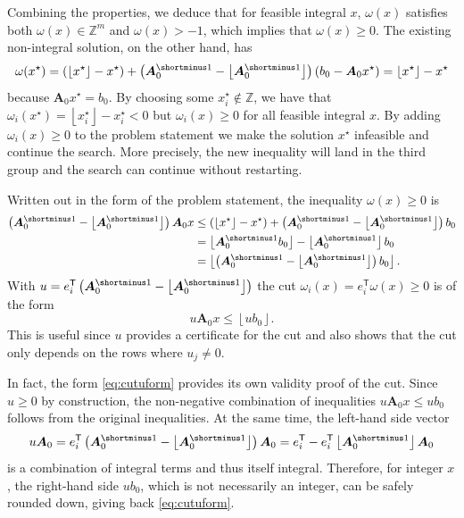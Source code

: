 \documentclass[a4paper, 12pt]{article}
\newcommand{\Z} {\mathbb{Z}}
\newcommand{\minv} { {\shortminus1} }
\newcommand{\mtrp} {\mathsf{T}}
\newcommand{\floor}[1]{\left\lfloor #1 \right\rfloor}
\newcommand{\stared}[1]{#1^\star}
\begin{document}
Combining the properties, we deduce that for feasible integral $x$, $\omega(x)$ satisfies both $\omega(x) \in \Z^m$ and $\omega(x) > -1$, which implies that $\omega(x) \geq 0$.
The existing non-integral solution, on the other hand, has
\begin{equation*}
\omega(\stared{x}) = \left(\floor{\stared{x}} - \stared{x}\right) + \left(\bm{A}_0^\minv - \floor{\bm{A}_0^\minv}\right) \left(b_0 - \bm{A}_0 \stared{x}\right) = \floor{\stared{x}} - \stared{x}
\end{equation*}
because $\bm{A}_0 \stared{x} = b_0$. By choosing some $\stared{x}_i \notin \Z$, we have that $\omega_i(\stared{x}) = \floor{\stared{x}_i} - \stared{x}_i < 0$ but $\omega_i(x) \geq 0$ for all feasible integral $x$. By adding $\omega_i(x) \geq 0$ to the problem statement we make the solution $\stared{x}$ infeasible and continue the search. More precisely, the new inequality will land in the third group and the search can continue without restarting.

Written out in the form of the problem statement, the inequality $\omega(x) \geq 0$ is
\begin{align*}
\left(\bm{A}_0^\minv - \floor{\bm{A}_0^\minv}\right) \bm{A}_0 x
&\leq \left(\floor{\stared{x}} - \stared{x}\right) + \left(\bm{A}_0^\minv - \floor{\bm{A}_0^\minv}\right) b_0 \\
&= \floor{\bm{A}_0^\minv b_0} - \floor{\bm{A}_0^\minv} b_0 \\
&= \floor{\left(\bm{A}_0^\minv - \floor{\bm{A}_0^\minv}\right) b_0}.
\end{align*}
With $u = e_i^\mtrp \left(\bm{A}_0^\minv - \floor{\bm{A}_0^\minv}\right)$ the cut $\omega_i(x) = e_i^\mtrp \omega(x) \geq 0$ is of the form
\begin{equation}\label{eq:cutuform}
u \bm{A}_0 x \leq \floor{u b_0}.
\end{equation}
This is useful since $u$ provides a certificate for the cut and also shows that the cut only depends on the rows where $u_j \neq 0$.

In fact, the form \eqref{eq:cutuform} provides its own validity proof of the cut. Since $u \geq 0$ by construction, the non-negative combination of inequalities $u \bm{A}_0 x \leq u b_0$ follows from the original inequalities. At the same time, the left-hand side vector
\begin{equation*}
u \bm{A}_0 = e_i^\mtrp \left(\bm{A}_0^\minv - \floor{\bm{A}_0^\minv}\right) \bm{A}_0 = e_i^\mtrp - e_i^\mtrp \floor{\bm{A}_0^\minv} \bm{A}_0
\end{equation*}
is a combination of integral terms and thus itself integral. Therefore, for integer $x$, the right-hand side $u b_0$, which is not necessarily an integer, can be safely rounded down, giving back \eqref{eq:cutuform}.
\end{document}
